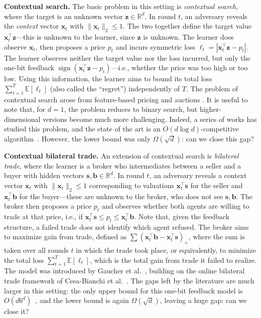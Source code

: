 \documentclass[11pt]{article}
\newcommand{\E}[1]{\mathbb E\left[#1\right]}
\newcommand{\R}{\mathbb R}
\newcommand{\norm}[1]{\lVert #1\rVert_2}
\newcommand{\bx}{\boldsymbol x}
\newcommand{\bz}{\boldsymbol z}
\begin{document}
\textbf{Contextual search.}  The basic problem in this setting is
\emph{contextual search}, where the target is an unknown vector
$\bz\in\R^d$. In round $t$, an adversary reveals the \emph{context}
vector $\bx_t$ with $\norm{\bx_t}\le1$. The two together define the
target value $\bx_t^\top \bz$---this is unknown to the learner, since
$\bz$ {is unknown}. The learner does observe $\bx_t$, then proposes a
price $p_t$ and incurs symmetric loss
$\ell_t=|\bx_t^\top\bz-p_t|$. The learner {observes neither the target
value nor the loss incurred}, but only the one-bit feedback
$\operatorname{sign}(\bx_t^\top\bz-p_t)$---i.e., whether the price
was too high or too low. Using this information, the learner aims to
bound {its} total loss $\sum_{t=1}^T\E{\ell_t}$ (also called the
``regret'') independently of $T$. The problem of contextual search
arose from feature-based pricing and auctions
\cite{KleinbergL03,CLPL16,LPLV18}. It is useful to {note} that, for $d=1$, the
problem reduces to binary search, but higher-dimensional versions
become much more
challenging. 
Indeed, a series of works {has studied} this problem, and the
{state of the art} is an $O(d \log d)$-competitive
algorithm~\cite{LPS21}. However, the lower bound was only
$\Omega(\sqrt{d})$: can we close this gap?


\textbf{Contextual bilateral trade.}  An extension of contextual
search is \emph{bilateral trade}, where the learner is a broker who
intermediates between a seller and a buyer with hidden vectors
$\boldsymbol s,\boldsymbol b\in\R^d$.  In round $t$, an adversary
reveals a context vector $\bx_t$ with $\norm{\bx_t}\le1$ corresponding to valuations
$\bx_t^\top \boldsymbol s$ for the seller and $\bx_t^\top \boldsymbol b$ for the buyer---{these} are unknown to the broker, {who} does not see $\boldsymbol s, \boldsymbol b$. The broker then proposes a price $p_t$ and observes whether both agents are willing to trade at that price, i.e., if
$\bx_t^\top \boldsymbol s \leq p_t \leq \bx_t^\top \boldsymbol b$. {Note that, given the feedback structure,} a failed trade does not identify which agent refused. The
broker aims to maximize gain from trade, defined as
$\sum (\bx_t^\top \boldsymbol b-\bx_t^\top \boldsymbol s)_+$, where the sum
is taken over all rounds $t$ in which the trade took place, or
equivalently, to minimize the total loss $\sum_{t=1}^T\E{\ell_t}$, which is the total gain
from trade it failed to realize. The model was introduced by Gaucher
et al.~\cite{GBCCP25}, building on the online bilateral trade
framework of Cesa-Bianchi et
al.~\cite{CCCFL21,Cesa-BianchiCCF24}. 
The gaps left by the literature are much larger in this setting: the only upper bound for
this one-bit feedback model {is} $O(d 6^d)$~\cite{CFGLPR26}, and the
lower bound is again $\Omega(\sqrt{d})$, leaving a huge gap: can we
{close it?}
\end{document}
